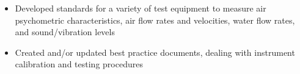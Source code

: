 
\ExperienceExpanded
{
    \begin{itemize}
        \item Developed standards for a variety of test equipment to measure
        air psychometric characteristics, air flow rates and velocities,
        water flow rates, and sound/vibration levels
        \item Created and/or updated best practice documents, dealing with
        instrument calibration and testing procedures
    \end{itemize}
}